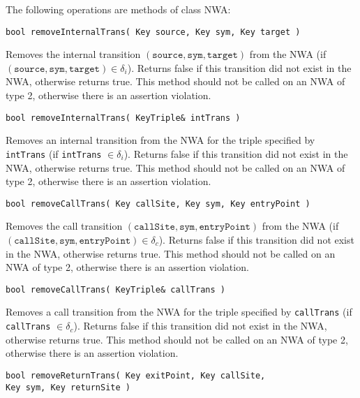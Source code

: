 \noindent The following operations are methods of class NWA:

\begin{description}

  \item\texttt{bool removeInternalTrans( Key source, Key sym, Key target )} \nopagebreak

    Removes the internal transition
    $(\texttt{source},\texttt{sym},\texttt{target})$ from the NWA (if
    $(\texttt{source},\texttt{sym},\texttt{target}) \in \delta_i$).  Returns
    false if this transition did not exist in the NWA, otherwise returns
    true.  This method should not be called on an NWA of type 2, otherwise
    there is an assertion violation.

  \item\texttt{bool removeInternalTrans( KeyTriple\& intTrans )} \nopagebreak 

    Removes an internal transition from the NWA for the triple specified by
    \texttt{intTrans} (if \texttt{intTrans} $\in \delta_i$).  Returns false
    if this transition did not exist in the NWA, otherwise returns true.
    This method should not be called on an NWA of type 2, otherwise there is
    an assertion violation.

  \item\texttt{bool removeCallTrans( Key callSite, Key sym, Key entryPoint )} \nopagebreak

    Removes the call transition
    $(\texttt{callSite},\texttt{sym},\texttt{entryPoint})$ from the NWA (if
    $(\texttt{callSite},\texttt{sym},\texttt{entryPoint}) \in \delta_c$).
    Returns false if this transition did not exist in the NWA, otherwise
    returns true.  This method should not be called on an NWA of type 2,
    otherwise there is an assertion violation.
 
  \item\texttt{bool removeCallTrans( KeyTriple\& callTrans )} \nopagebreak

    Removes a call transition from the NWA for the triple specified by
    \texttt{callTrans} (if \texttt{callTrans} $\in \delta_c$).  Returns false
    if this transition did not exist in the NWA, otherwise returns true.
    This method should not be called on an NWA of type 2, otherwise there is
    an assertion violation.

  \item\texttt{bool removeReturnTrans( Key exitPoint, Key
    callSite,\\ \hspace*{3.25cm} Key sym, Key returnSite )} \nopagebreak


\end{description}
